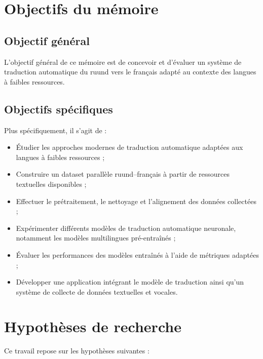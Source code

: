 \section{Objectifs du mémoire}

\subsection{Objectif général}

L'objectif général de ce mémoire est de concevoir et d'évaluer un système de traduction automatique du ruund vers le français adapté au contexte des langues à faibles ressources.

\subsection{Objectifs spécifiques}

Plus spécifiquement, il s'agit de :

\begin{itemize}
    \item Étudier les approches modernes de traduction automatique adaptées aux langues à faibles ressources ;

    \item Construire un dataset parallèle ruund--français à partir de ressources textuelles disponibles ;

    \item Effectuer le prétraitement, le nettoyage et l'alignement des données collectées ;

    \item Expérimenter différents modèles de traduction automatique neuronale, notamment les modèles multilingues pré-entraînés ;

    \item Évaluer les performances des modèles entraînés à l'aide de métriques adaptées ;

    \item Développer une application intégrant le modèle de traduction ainsi qu'un système de collecte de données textuelles et vocales.
\end{itemize}

\section{Hypothèses de recherche}

Ce travail repose sur les hypothèses suivantes :

